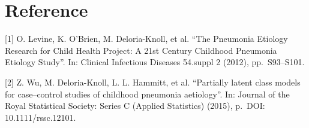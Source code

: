 \documentclass[article]{jss}
\begin{document}
\section{Reference}\label{reference}

{[}1{]} O. Levine, K. O'Brien, M. Deloria-Knoll, et al. ``The Pneumonia
Etiology Research for Child Health Project: A 21st Century Childhood
Pneumonia Etiology Study''. In: Clinical Infectious Diseases 54.suppl 2
(2012), pp.~S93--S101.

{[}2{]} Z. Wu, M. Deloria-Knoll, L. L. Hammitt, et al. ``Partially
latent class models for case--control studies of childhood pneumonia
aetiology''. In: Journal of the Royal Statistical Society: Series C
(Applied Statistics) (2015), p.~DOI: 10.1111/rssc.12101.
\end{document}
